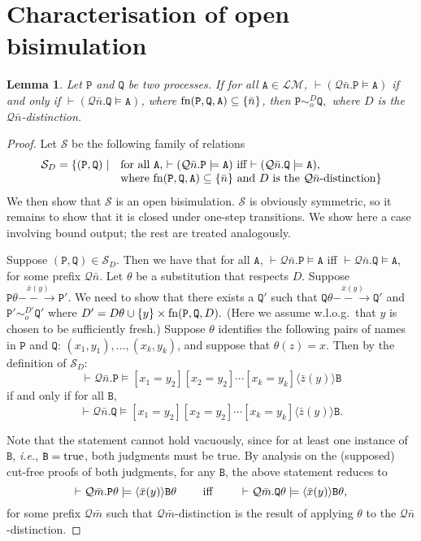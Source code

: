 \documentclass{acmtrans2m}
\newtheorem{lemma}[theorem]{Lemma}
\newcommand{\ie}{{\em i.e.}}
\def \mTrue {\hbox{true}}
\def\Lscr{{\mathcal L}}
\def\Mscr{{\mathcal M}}
\def\Qscr{{\mathcal Q}}
\def\Sscr{{\mathcal S}}
\def\Api{{\mathtt A}}
\def\Bpi{{\mathtt B}}
\def\Ppi{{\mathtt P}}
\def\Qpi{{\mathtt Q}}
\newcommand{\one  }[3]{#1\stackrel{#2}{-\!\!-\!\!\!\rightarrow    } #3}
\newcommand{\fn}[1]{{\rm fn}(#1)}
\begin{document}
\section{Characterisation of open bisimulation}

\begin{lemma}
\label{lm:ch-open-sound}
Let $\Ppi$ and $\Qpi$ be two processes. 
If for all $\Api \in \Lscr\Mscr$, 
$\vdash (\Qscr \bar n. \Ppi \models \Api)$ if and only if $\vdash (\Qscr \bar n. 
\Qpi \models \Api)$, where $\fn{\Ppi,\Qpi,\Api} \subseteq \{ \bar n\}$, 
then $\Ppi \sim_o^{D} \Qpi,$ where $D$ is the $\Qscr \bar n$-distinction.
\end{lemma}
\begin{proof}
Let $\Sscr$ be the following family of relations 
$$
\begin{array}{ll}
\Sscr_D = \{ (\Ppi, \Qpi) \mid & \hbox{for all $\Api$, $\vdash (\Qscr \bar n. \Ppi \models \Api)$ iff
$\vdash (\Qscr \bar n. \Qpi \models \Api)$,} \\
 & \hbox{where $\fn{\Ppi,\Qpi,\Api} \subseteq \{\bar n\}$ and $D$ is the $\Qscr \bar n$-distinction}  \} 
\end{array}
$$
We then show that $\Sscr$ is an open bisimulation. $\Sscr$ is obviously symmetric, so it remains
to show that it is closed under one-step transitions. 
We show here a case involving bound output; 
the rest are treated analogously.

Suppose $(\Ppi, \Qpi) \in \Sscr_D$. Then we have that for all $\Api$, 
$\vdash \Qscr \bar n. \Ppi \models \Api$ iff $\vdash \Qscr \bar n. \Qpi \models \Api$,
for some prefix $\Qscr \bar n.$
Let $\theta$ be a substitution that respects $D$. Suppose 
$\one{\Ppi\theta }{\bar x(y)}{\Ppi'}.$ We need to show that there exists a $\Qpi'$
such that $\one{\Qpi\theta}{\bar x(y)}{\Qpi'}$ and $\Ppi' \sim_o^{D'} \Qpi'$
where $D' = D\theta \cup \{ y  \} \times \fn{\Ppi,\Qpi,D}.$ (Here we
assume w.l.o.g.\ that 
$y$ is chosen to be sufficiently fresh.)
Suppose $\theta$ identifies the following pairs of names in $\Ppi$ and $\Qpi$:
$(x_1,y_1), \ldots, (x_k, y_k)$, and suppose that $\theta(z) = x.$
Then by the definition of $\Sscr_D$:
$$
\vdash \Qscr \bar n. \Ppi \models [x_1 = y_2][x_2 = y_2] \cdots [x_{k} = y_k] \langle \bar z(y)\rangle \Bpi 
$$
if and only if for all $\Bpi$,
$$
\vdash \Qscr \bar n. \Qpi \models [x_1 = y_2][x_2 = y_2] \cdots [x_{k} = y_k] \langle \bar z(y)\rangle \Bpi.
$$


Note that the statement cannot hold vacuously, since for at least
one instance of $\Bpi$, \ie, $\Bpi = \mTrue$, both judgments must be true.
By analysis on the (supposed) cut-free proofs of both judgments, for any $\Bpi$, 
the above statement reduces to
$$
\vdash \Qscr \bar m. \Ppi\theta \models \langle \bar x(y) \rangle  \Bpi\theta 
\qquad \hbox{ iff } \qquad
\vdash \Qscr \bar m. \Qpi\theta \models \langle \bar x(y)\rangle \Bpi\theta, 
$$
for some prefix $\Qscr \bar m$ such that $\Qscr \bar m$-distinction
is the result of applying $\theta$ to the $\Qscr \bar n$-distinction.


\end{proof}
\end{document}
